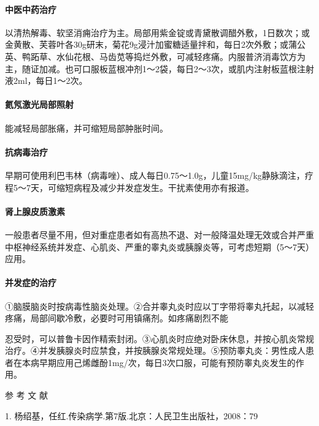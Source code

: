\paragraph{中医中药治疗}

以清热解毒、软坚消痈治疗为主。局部用紫金锭或青黛散调醋外敷，1日数次；或金黄散、芙蓉叶各30g研末，菊花9g浸汁加蜜糖适量拌和，每日2次外敷；或蒲公英、鸭跖草、水仙花根、马齿苋等捣烂外敷，可减轻疼痛。内服普济消毒饮方为主，随证加减。也可口服板蓝根冲剂1～2袋，每日2～3次，或肌内注射板蓝根注射液2ml，每日1～2次。

\paragraph{氦氖激光局部照射}

能减轻局部胀痛，并可缩短局部肿胀时间。

\paragraph{抗病毒治疗}

早期可使用利巴韦林（病毒唑）、成人每日0.75～1.0g，儿童15mg/kg静脉滴注，疗程5～7天，可缩短病程及减少并发症发生。干扰素使用亦有报道。

\paragraph{肾上腺皮质激素}

一般患者尽量不用，但对重症患者如有高热不退、对一般降温处理无效或合并严重中枢神经系统并发症、心肌炎、严重的睾丸炎或胰腺炎等，可考虑短期（5～7天）应用。

\paragraph{并发症的治疗}

①脑膜脑炎时按病毒性脑炎处理。②合并睾丸炎时应以丁字带将睾丸托起，以减轻疼痛，局部间歇冷敷，必要时可用镇痛剂。如疼痛剧烈不能

忍受时，可以普鲁卡因作精索封闭。③心肌炎时应绝对卧床休息，并按心肌炎常规治疗。④并发胰腺炎时应禁食，并按胰腺炎常规处理。⑤预防睾丸炎：男性成人患者在本病早期应用己烯雌酚1mg/次，每日3次口服，可能有预防睾丸炎发生的作用。

\protect\hypertarget{text00216.html}{}{}

\hypertarget{text00216.htmlux5cux23CHP7-3-4}{}
参 考 文 献

1. 杨绍基，任红.传染病学.第7版.北京：人民卫生出版社，2008：79


